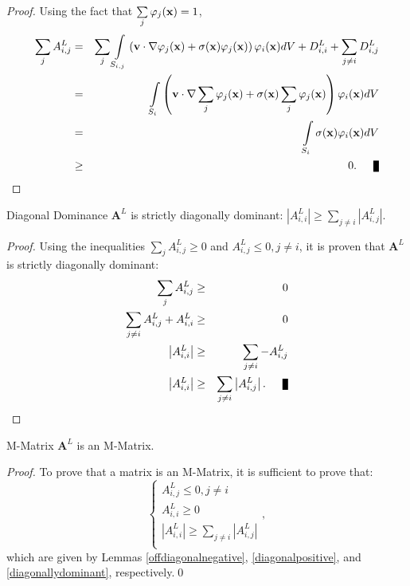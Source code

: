 \begin{proof}
Using the fact that $\sum\limits_j\varphi_j(\mathbf{x})=1$,
\begin{eqnarray*}
   \sumj A^L_{i,j} & = & \sumj\intSij
      \left(\v\cdot\nabla\varphi_j(\x) +
      \sigma(\x)\varphi_j(\x)\right)\varphi_i(\x) dV +
      D_{i,i}^L + \sum\limits_{j\neq i}D_{i,j}^L\\
   & = & \intSi\left(\v\cdot\nabla\sumj\varphi_j(\x) +
      \sigma(\x)\sumj\varphi_j(\x)\right)\varphi_i(\x) dV\\
   \label{rowsum} & = & \intSi\sigma(\x)\varphi_i(\x) dV\\
   &\ge& 0.\qed
\end{eqnarray*}
\end{proof}
\begin{lemma}[label={diagonallydominant}]{Diagonal Dominance}
   $\mathbf{A}^L$ is strictly diagonally dominant:
   $\left|A^L_{i,i}\right| \ge \sum\limits_{j\ne i} \left|A^L_{i,j}\right|$.
\end{lemma}
\begin{proof}
Using the inequalities $\sum\limits_j A^L_{i,j} \ge 0$ and $A^L_{i,j}\le 0, j\ne i$,
it is proven that $\mathbf{A}^L$ is strictly diagonally dominant:
\begin{eqnarray*}
	\sum\limits_j A^L_{i,j} & \ge & 0\\
	\sum\limits_{j\ne i} A^L_{i,j} + A^L_{i,i} & \ge & 0\\
	\left|A^L_{i,i}\right| & \ge & \sum\limits_{j\ne i} -A^L_{i,j}\\
	\left|A^L_{i,i}\right| & \ge & \sum\limits_{j\ne i} \left|A^L_{i,j}\right|.\qed
\end{eqnarray*}
\end{proof}
\begin{lemma}{M-Matrix}
   $\mathbf{A}^L$ is an M-Matrix.
\end{lemma}
\begin{proof}
To prove that a matrix is an M-Matrix, it is sufficient to prove that:
\[
\left\{\begin{array}{l}
A^L_{i,j}\le 0, j\ne i\\
A^L_{i,i}\ge 0\\
\left|A^L_{i,i}\right| \ge \sum\limits_{j\ne i} \left|A^L_{i,j}\right|\\
\end{array}
\right.,
\]
which are given by Lemmas \ref{offdiagonalnegative}, \ref{diagonalpositive}, and
\ref{diagonallydominant}, respectively.\qed
\end{proof}
